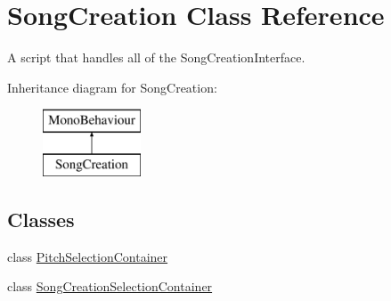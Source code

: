 \hypertarget{class_song_creation}{}\section{Song\+Creation Class Reference}
\label{class_song_creation}


A script that handles all of the Song\+Creation\+Interface.  


Inheritance diagram for Song\+Creation\+:\begin{figure}[H]
\begin{center}
\leavevmode
\includegraphics[height=2.000000cm]{class_song_creation}
\end{center}
\end{figure}
\subsection*{Classes}
\begin{DoxyCompactItemize}
\item 
class \hyperlink{class_song_creation_1_1_pitch_selection_container}{Pitch\+Selection\+Container}
\item 
class \hyperlink{class_song_creation_1_1_song_creation_selection_container}{Song\+Creation\+Selection\+Container}
\end{DoxyCompactItemize}

